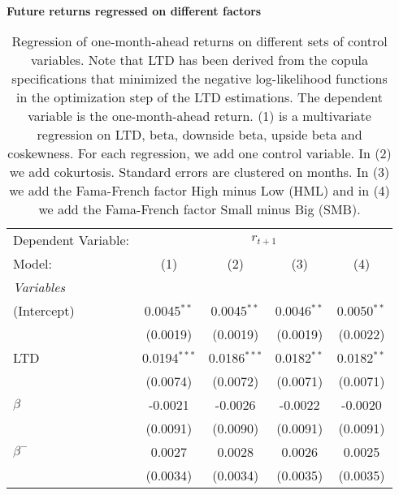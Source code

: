 \begin{table}[H]
\caption{\\ \large{\textbf{Future returns regressed on different factors}}}
\captionsetup{justification = justified, width = \linewidth}
\caption*{Regression of one-month-ahead returns on different
                               sets of control variables. Note that LTD has been derived from the 
                               copula specifications that minimized the negative log-likelihood functions
                               in the optimization step of the LTD estimations. The dependent variable is
                               the one-month-ahead return. (1) is a multivariate 
                               regression on LTD, beta, downside beta, upside beta and coskewness. For each regression, we
                               add one control variable. In (2) we add cokurtosis. 
                               Standard errors are clustered on months. In (3) we add the Fama-French
                               factor High minus Low (HML) and in (4) we add the Fama-French factor
                               Small minus Big (SMB).}
   \centering
\label{reg_clustered_on_time_2_ltd_nll}
   \begin{tabular}{lcccc}
      \tabularnewline \midrule \midrule
      Dependent Variable: & \multicolumn{4}{c}{$r_{t+1}$}\\
      Model:         & (1)            & (2)            & (3)           & (4)\\  
      \midrule
      \emph{Variables}\\
      (Intercept)    & 0.0045$^{**}$  & 0.0045$^{**}$  & 0.0046$^{**}$ & 0.0050$^{**}$\\   
                     & (0.0019)       & (0.0019)       & (0.0019)      & (0.0022)\\   
      LTD            & 0.0194$^{***}$ & 0.0186$^{***}$ & 0.0182$^{**}$ & 0.0182$^{**}$\\   
                     & (0.0074)       & (0.0072)       & (0.0071)      & (0.0071)\\   
      $\beta$        & -0.0021        & -0.0026        & -0.0022       & -0.0020\\   
                     & (0.0091)       & (0.0090)       & (0.0091)      & (0.0091)\\   
      $\beta^{-}$    & 0.0027         & 0.0028         & 0.0026        & 0.0025\\   
                     & (0.0034)       & (0.0034)       & (0.0035)      & (0.0035)\\   

\end{tabular}
\end{table}

